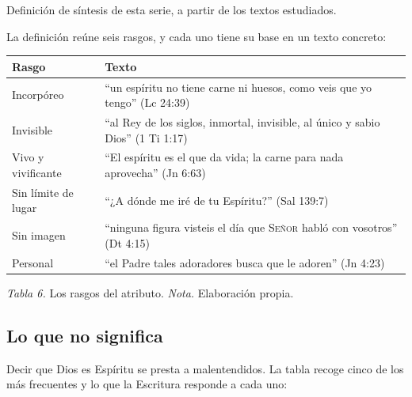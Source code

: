 \documentclass[11pt,letterpaper]{article}
\newcommand{\SENOR}{\textsc{Señor}}
\begin{document}
\begin{nota}[Precisión]
Definición de síntesis de esta serie, a partir de los textos estudiados.
\end{nota}

La definición reúne seis rasgos, y cada uno tiene su base en un texto concreto:

\begin{center}\small\renewcommand{\arraystretch}{1.22}
\begin{tabular}{@{}L{3.6cm}L{10.6cm}@{}}
\toprule
\textbf{Rasgo} & \textbf{Texto} \\ \midrule
Incorpóreo & ``un espíritu no tiene carne ni huesos, como veis que yo tengo'' (Lc 24:39) \\
Invisible & ``al Rey de los siglos, inmortal, invisible, al único y sabio Dios'' (1 Ti 1:17) \\
Vivo y vivificante & ``El espíritu es el que da vida; la carne para nada aprovecha'' (Jn 6:63) \\
Sin límite de lugar & ``¿A dónde me iré de tu Espíritu?'' (Sal 139:7) \\
Sin imagen & ``ninguna figura visteis el día que \SENOR{} habló con vosotros'' (Dt 4:15) \\
Personal & ``el Padre tales adoradores busca que le adoren'' (Jn 4:23) \\
\bottomrule
\end{tabular}\par
{\footnotesize\color{gris}\textit{Tabla 6.} Los rasgos del atributo. \textit{Nota.} Elaboración propia.}
\end{center}

\subsection{Lo que no significa}

Decir que Dios es Espíritu se presta a malentendidos. La tabla recoge cinco de los más frecuentes y lo que la Escritura responde a cada uno:
\end{document}
